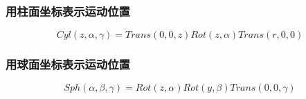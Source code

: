 \subsubsection{用柱面坐标表示运动位置}
\begin{equation}
Cyl(z, \alpha, \gamma)=Trans(0, 0, z)Rot(z, \alpha)Trans(r, 0, 0)
\end{equation}
\subsubsection{用球面坐标表示运动位置}
\begin{equation}
Sph(\alpha, \beta, \gamma)=Rot(z, \alpha)Rot(y, \beta)Trans(0, 0, \gamma)
\end{equation}